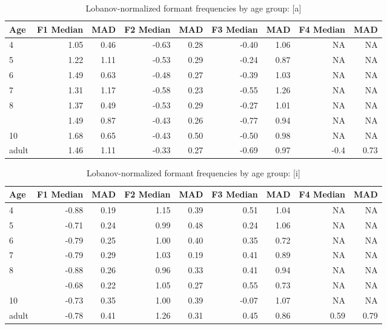 \documentclass[
]{article}
\begin{document}
\begin{table}[!h]

\caption{\label{tab:lobanov-meas-tbl-a}Lobanov-normalized formant frequencies by age group: [a]}
\centering
\begin{tabular}[t]{lrrrrrrrr}
\toprule
Age & F1 Median & MAD & F2 Median & MAD & F3 Median & MAD & F4 Median & MAD\\
\midrule
4 & 1.05 & 0.46 & -0.63 & 0.28 & -0.40 & 1.06 & NA & NA\\
5 & 1.22 & 1.11 & -0.53 & 0.29 & -0.24 & 0.87 & NA & NA\\
6 & 1.49 & 0.63 & -0.48 & 0.27 & -0.39 & 1.03 & NA & NA\\
7 & 1.31 & 1.17 & -0.58 & 0.23 & -0.55 & 1.26 & NA & NA\\
8 & 1.37 & 0.49 & -0.53 & 0.29 & -0.27 & 1.01 & NA & NA\\
\addlinespace
9 & 1.49 & 0.87 & -0.43 & 0.26 & -0.77 & 0.94 & NA & NA\\
10 & 1.68 & 0.65 & -0.43 & 0.50 & -0.50 & 0.98 & NA & NA\\
adult & 1.46 & 1.11 & -0.33 & 0.27 & -0.69 & 0.97 & -0.4 & 0.73\\
\bottomrule
\end{tabular}
\end{table}

\begin{table}[!h]

\caption{\label{tab:lobanov-meas-tbl-i}Lobanov-normalized formant frequencies by age group: [i]}
\centering
\begin{tabular}[t]{lrrrrrrrr}
\toprule
Age & F1 Median & MAD & F2 Median & MAD & F3 Median & MAD & F4 Median & MAD\\
\midrule
4 & -0.88 & 0.19 & 1.15 & 0.39 & 0.51 & 1.04 & NA & NA\\
5 & -0.71 & 0.24 & 0.99 & 0.48 & 0.24 & 1.06 & NA & NA\\
6 & -0.79 & 0.25 & 1.00 & 0.40 & 0.35 & 0.72 & NA & NA\\
7 & -0.79 & 0.29 & 1.03 & 0.19 & 0.41 & 0.89 & NA & NA\\
8 & -0.88 & 0.26 & 0.96 & 0.33 & 0.41 & 0.94 & NA & NA\\
\addlinespace
9 & -0.68 & 0.22 & 1.05 & 0.27 & 0.55 & 0.73 & NA & NA\\
10 & -0.73 & 0.35 & 1.00 & 0.39 & -0.07 & 1.07 & NA & NA\\
adult & -0.78 & 0.41 & 1.26 & 0.31 & 0.45 & 0.86 & 0.59 & 0.79\\
\bottomrule
\end{tabular}
\end{table}
\end{document}
